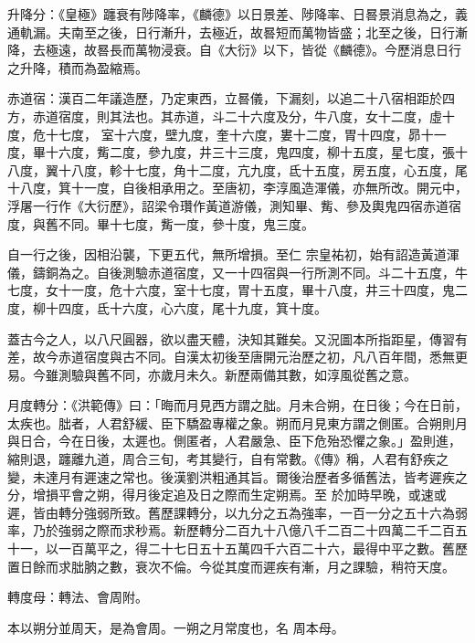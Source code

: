 \begin{pinyinscope}
 升降分：《皇極》躔衰有陟降率，《麟德》以日景差、陟降率、日晷景消息為之，義通軌漏。夫南至之後，日行漸升，去極近，故晷短而萬物皆盛；北至之後，日行漸降，去極遠，故晷長而萬物浸衰。自《大衍》以下，皆從《麟德》。今歷消息日行之升降，積而為盈縮焉。



 赤道宿：漢百二年議造歷，乃定東西，立晷儀，下漏刻，以追二十八宿相距於四方，赤道宿度，則其法也。其赤道，斗二十六度及分，牛八度，女十二度，虛十度，危十七度，
 室十六度，壁九度，奎十六度，婁十二度，胃十四度，昴十一度，畢十六度，觜二度，參九度，井三十三度，鬼四度，柳十五度，星七度，張十八度，翼十八度，軫十七度，角十二度，亢九度，氐十五度，房五度，心五度，尾十八度，箕十一度，自後相承用之。至唐初，李淳風造渾儀，亦無所改。開元中，浮屠一行作《大衍歷》，詔梁令瓚作黃道游儀，測知畢、觜、參及輿鬼四宿赤道宿度，與舊不同。畢十七度，觜一度，參十度，鬼三度。



 自一行之後，因相沿襲，下更五代，無所增損。至仁
 宗皇祐初，始有詔造黃道渾儀，鑄銅為之。自後測驗赤道宿度，又一十四宿與一行所測不同。斗二十五度，牛七度，女十一度，危十六度，室十七度，胃十五度，畢十八度，井三十四度，鬼二度，柳十四度，氐十六度，心六度，尾十九度，箕十度。



 蓋古今之人，以八尺圓器，欲以盡天體，決知其難矣。又況圖本所指距星，傳習有差，故今赤道宿度與古不同。自漢太初後至唐開元治歷之初，凡八百年間，悉無更易。今雖測驗與舊不同，亦歲月未久。新歷兩備其數，如淳風從舊之意。



 月度轉分：《洪範傳》曰：「晦而月見西方謂之朏。月未合朔，在日後；今在日前，太疾也。朏者，人君舒緩、臣下驕盈專權之象。朔而月見東方謂之側匿。合朔則月與日合，今在日後，太遲也。側匿者，人君嚴急、臣下危殆恐懼之象。」盈則進，縮則退，躔離九道，周合三旬，考其變行，自有常數。《傳》稱，人君有舒疾之變，未達月有遲速之常也。後漢劉洪粗通其旨。爾後治歷者多循舊法，皆考遲疾之分，增損平會之朔，得月後定追及日之際而生定朔焉。至
 於加時早晚，或速或遲，皆由轉分強弱所致。舊歷課轉分，以九分之五為強率，一百一分之五十六為弱率，乃於強弱之際而求秒焉。新歷轉分二百九十八億八千二百二十四萬二千二百五十一，以一百萬平之，得二十七日五十五萬四千六百二十六，最得中平之數。舊歷置日餘而求朏朒之數，衰次不倫。今從其度而遲疾有漸，月之課驗，稍符天度。



 轉度母：轉法、會周附。



 本以朔分並周天，是為會周。一朔之月常度也，名
 周本母。




\end{pinyinscope}
